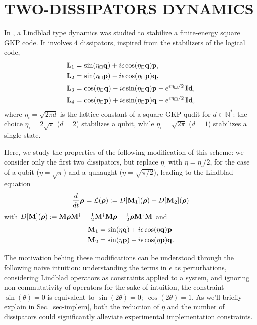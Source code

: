 \documentclass[a4paper, 11pt]{article}
\newcommand{\orho}{{\boldsymbol \rho}}
\newcommand{\oL}{{\bf L}}
\newcommand{\oM}{{\bf M}}
\newcommand{\oq}{{\bf q}}
\newcommand{\op}{{\bf p}}
\newcommand{\oid}{{\bf Id}}
\newcommand{\etasq}{\eta_{\scriptscriptstyle \square}}
\begin{document}
\section{TWO-DISSIPATORS DYNAMICS}
\label{sec-main-eq} 
In \cite{sellemDissipativeProtectionGKP2025},
a Lindblad type dynamics was studied to stabilize a finite-energy square GKP code. It involves 
$4$ dissipators, inspired from the stabilizers of the logical code,
\begin{equation}
\begin{aligned}
    \oL_1 &= \sin(\etasq \oq) + i\epsilon\cos(\etasq \oq) \op,\\
    \oL_2 &= \sin(\etasq \op) - i\epsilon\cos(\etasq \op) \oq,\\
    \oL_3 &=   \cos(\etasq \oq) - i\epsilon\sin(\etasq \oq) \op  - e^{ \epsilon\etasq/2}\,\oid ,\\
    \oL_4 &= \cos(\etasq \op) + i\epsilon\sin(\etasq \op) \oq - e^{ \epsilon\etasq/2}\,\oid,
\end{aligned}
\label{eq-prx4}
\end{equation}
where $\etasq = \sqrt{2\pi d}$ is the lattice constant of a square GKP qudit for $d\in \mathbb N^*$: the choice $\etasq = 2\sqrt\pi$ ($d=2$) stabilizes a qubit, while $\etasq = \sqrt{2\pi}$ ($d=1$) stabilizes a single state.


Here, we study the properties of the following modification of this scheme: we consider only the first two dissipators, but replace $\etasq$ with $\eta = \etasq/2$, for the case of a qubit ($\eta = \sqrt\pi$) and a qunaught ($\eta  = \sqrt{\pi/2}$), leading to the Lindblad equation
\begin{equation}
    \frac{d}{dt}\orho =  \mathcal L(\orho) := D[\oM_1](\orho) +  D[\oM_2](\orho)
    \label{eq-main-lindblad}
\end{equation}
with $D[\oM](\orho) := \oM \orho \oM^\dagger - \frac12\oM^\dagger\oM\orho - \frac12\orho\oM^\dagger\oM$ and
\begin{align}
    \oM_1 &= \sin(\eta \oq) + i\epsilon\cos(\eta \oq) \op\\
    \oM_2 &= \sin(\eta \op) - i\epsilon\cos(\eta \op) \oq.
\end{align}

The motivation behing these modifications can be understood through the following naive intuition:
understanding the terms in $\epsilon$ as perturbations, considering Lindblad operators as constraints applied to a system, and ignoring non-commutativity of operators for the sake of intuition, the constraint $\sin(\theta) = 0$ is equivalent to $\sin(2\theta) = 0; \; \cos(2\theta)=1$.
As we'll briefly explain in Sec. \ref{sec-implem},
both the reduction of $\eta$ and the number of dissipators could significantly alleviate experimental implementation constraints.
\end{document}
